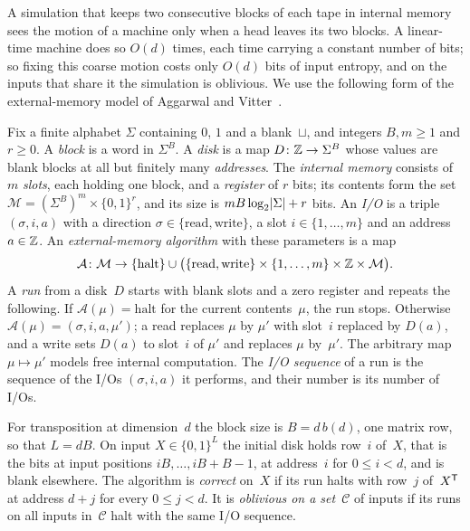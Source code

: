 A simulation that keeps two consecutive blocks of each tape in internal memory sees the motion of a machine only when a
head leaves its two blocks. A linear-time machine does so $O(d)$ times, each time carrying a constant number of bits; so
fixing this coarse motion costs only $O(d)$ bits of input entropy, and on the inputs that share it the simulation is
oblivious. We use the following form of the external-memory model of Aggarwal and Vitter~\cite{AggarwalVitter1988}.

\begin{definition}\label{def:EM}
Fix a finite alphabet $\Sigma$ containing $0$, $1$ and a blank~$\sqcup$, and integers $B,m\ge1$ and $r\ge0$. A
\emph{block} is a word in $\Sigma^B$. A \emph{disk} is a map $D\colon\mathbb{Z}\to\Sigma^B$ whose values are blank blocks at all
but finitely many \emph{addresses}. The \emph{internal memory} consists of $m$ \emph{slots}, each holding one block, and a
\emph{register} of $r$ bits; its contents form the set $\mathcal M=(\Sigma^B)^m\times\{0,1\}^r$, and its size is
$mB\log_2\lvert \Sigma \rvert+r$ bits. An \emph{I/O} is a triple $(\sigma,i,a)$ with a direction
$\sigma\in\{\mathrm{read},\mathrm{write}\}$, a slot $i\in\{1,\dots,m\}$ and an address $a\in\mathbb{Z}$. An
\emph{external-memory algorithm} with these parameters is a map
\[
 \mathcal A\colon\mathcal M\to\{\mathrm{halt}\}\cup\bigl(\{\mathrm{read},\mathrm{write}\}\times\{1,\dots,m\}\times\mathbb{Z}
 \times\mathcal M\bigr).
\]
A \emph{run} from a disk~$D$ starts with blank slots and a zero register and repeats the following. If
$\mathcal A(\mu)=\mathrm{halt}$ for the current contents~$\mu$, the run stops. Otherwise
$\mathcal A(\mu)=(\sigma,i,a,\mu')$; a read replaces $\mu$ by $\mu'$ with slot~$i$ replaced by $D(a)$, and a write sets
$D(a)$ to slot~$i$ of $\mu'$ and replaces $\mu$ by~$\mu'$. The arbitrary map $\mu\mapsto\mu'$ models free internal
computation. The \emph{I/O sequence} of a run is the sequence of the I/Os $(\sigma,i,a)$ it performs, and their number is
its number of I/Os.

For transposition at dimension~$d$ the block size is $B=d\,b(d)$, one matrix row, so that $L=dB$. On input
$X\in\{0,1\}^L$ the initial disk holds row~$i$ of~$X$, that is the bits at input positions $iB,\dots,iB+B-1$, at
address~$i$ for $0\le i<d$, and is blank elsewhere. The algorithm is \emph{correct} on~$X$ if its run halts with row~$j$
of~$X^{\mathsf{T}}$ at address $d+j$ for every $0\le j<d$. It is \emph{oblivious on a set}~$\mathcal C$ of inputs if its runs on
all inputs in~$\mathcal C$ halt with the same I/O sequence.
\end{definition}

